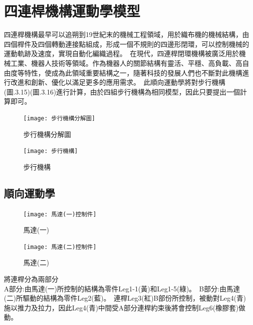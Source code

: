 \newpage

\section{四連桿機構運動學模型}

四連桿機構最早可以追朔到19世紀末的機械工程領域，用於織布機的機械結構，由四個桿件及四個轉動連接點組成，形成一個不規則的四邊形閉環，可以控制機械的運動軌跡及速度，實現自動化編織過程。\
在現代，四連桿閉環機構被廣泛用於機械工業、機器人技術等領域。作為機器人的關節結構有靈活、平穩、高負載、高自由度等特性，使成為此領域重要結構之一，隨著科技的發展人們也不斷對此機構進行改進和創新、優化以滿足更多的應用需求。\
此順向運動學將對步行機構(圖.3.15)(圖.3.16)進行計算，由於四組步行機構為相同模型，因此只要提出一個計算即可。\\
\begin{figure}[htbp]
  \begin{minipage}[t]{0.45\linewidth}
    \centering
    \texttt{[image: 步行機構分解圖]}
    \caption{步行機構分解圖}
    \label{步行機構分解圖}
  \end{minipage}
  \hfill
  \begin{minipage}[t]{0.45\linewidth}
    \centering
    \texttt{[image: 步行機構]}
    \caption{步行機構}
    \label{步行機構}
  \end{minipage}
\end{figure}
\newpage

\subsection{順向運動學}
\begin{figure}[htbp]
  \begin{minipage}[t]{0.5\linewidth}
    \centering
    \texttt{[image: 馬達(一)控制件]}
    \caption{馬達(一)}
    \label{馬達(一)控制件}
  \end{minipage}
  \hfill
  \begin{minipage}[t]{0.5\linewidth}
    \centering
    \texttt{[image: 馬達(二)控制件]}
    \caption{馬達(二)}
    \label{馬達(二)控制件}
  \end{minipage}
\end{figure}

將連桿分為兩部分\\
A部分:由馬達(一)所控制的結構為零件Leg1-1(黃)和Leg1-5(綠)。\
B部分:由馬達(二)所驅動的結構為零件Leg2(藍)。\
連桿Leg3(紅)B部份所控制，被動對Leg4(青)施以推力及拉力，因此Leg4(青)中間受A部分連桿約束後將會控制Leg6(橡膠套)做動。\\


